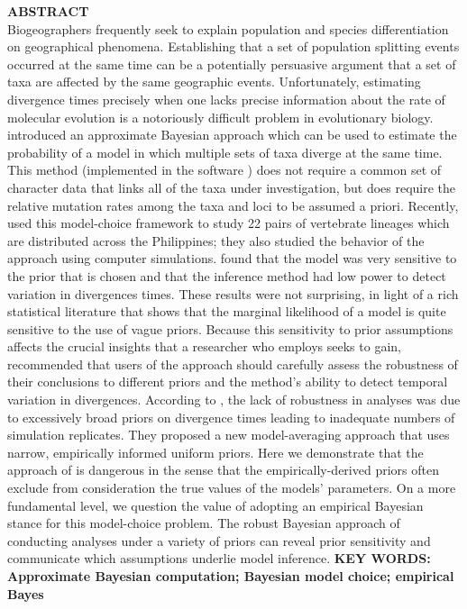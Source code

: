 \documentclass[letterpaper,12pt]{article}
\begin{document}
\begin{linenumbers}
{\sffamily
    \noindent\textbf{ABSTRACT} \\
    \noindent Biogeographers frequently seek to explain population and species
    differentiation on geographical phenomena.
    Establishing that a set of population splitting events occurred
    at the same time can be a potentially persuasive argument that a set of taxa
    are affected by the same geographic events.
    Unfortunately, estimating divergence times precisely when one lacks
    precise information about the rate of molecular evolution is a notoriously
    difficult problem in evolutionary biology.
    \citep{Huang2011} introduced an approximate Bayesian approach which can be
    used to estimate the probability of a model in which multiple sets of taxa
    diverge at the same time. 
    This method (implemented in the software \msb) does not require a common
    set of character data that links all of the taxa under investigation, but
    does require the relative mutation rates among the taxa and loci to be
    assumed a priori.
    Recently, \citet{Oaks2012} used this model-choice framework to 
    study 22 pairs of vertebrate lineages which are distributed across
    the Philippines; they also studied the behavior of the \msb approach
    using computer simulations.
    \citet{Oaks2012} found that the model was very sensitive to the 
    prior that is chosen and that the inference method had low power
    to detect variation in divergences times.
    These results were not surprising, in light of a rich statistical literature
    that shows that the marginal likelihood of a model is quite sensitive to the
    use of vague priors.
    Because this sensitivity to prior assumptions affects the crucial insights 
    that a researcher who employs \msb seeks to gain, \citet{Oaks2012} recommended
    that users of the approach should carefully assess the robustness of their 
    conclusions to different priors and the method's ability to detect
    temporal variation in divergences.
    According to \citet{Hickerson2013}, the lack of robustness in \msb analyses
    was due to excessively broad priors on divergence times leading to 
    inadequate numbers of simulation replicates.
    They proposed a new model-averaging approach that uses narrow, empirically informed uniform
    priors.
    Here we demonstrate that the approach of \citet{Hickerson2013} is
    dangerous in the sense that the empirically-derived priors often
    exclude from consideration the true values of the models' parameters.
    On a more fundamental level, we question the value of adopting an 
    empirical Bayesian stance for this model-choice problem.
    The robust Bayesian approach of conducting analyses under a variety
    of priors can reveal prior sensitivity and communicate which assumptions
    underlie model inference.
    \vspace{12pt}
    \noindent\textbf{KEY WORDS: Approximate Bayesian computation; Bayesian
        model choice; empirical Bayes} 

}
\end{linenumbers}
\end{document}
